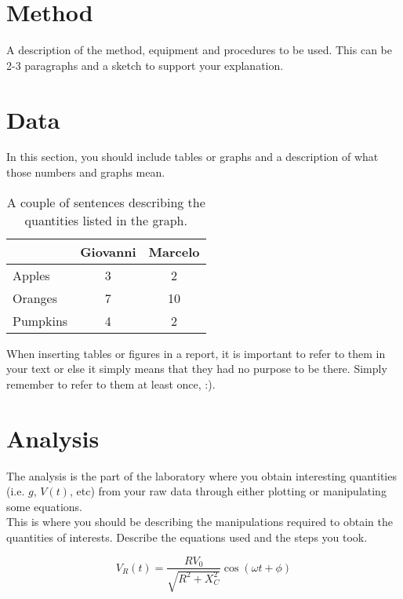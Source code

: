 \documentclass{article}[12pt]
\begin{document}
\section{Method}

A description of the method, equipment and procedures to be used. This can be 2-3 paragraphs and a sketch to support your explanation.

\section{Data}

In this section, you should include tables or graphs and a description of what those numbers and graphs mean.

\begin{table}[h]
\centering
\begin{tabular}{| l | c | c | }

\hline
		& Giovanni	& Marcelo\\
\hline \hline
Apples	&	3		&	2\\ 	\hline
Oranges	&	7		&	10\\ 	\hline
Pumpkins &	4		&	2\\	\hline

\end{tabular}
\caption{A couple of sentences describing the quantities listed in the graph.}
\label{Groceries}
\end{table}

When inserting tables or figures in a report, it is important to refer to them in your text or else it simply means that they had no purpose to be there. Simply remember to refer to them at least once, :).


\section{Analysis}

The analysis is the part of the laboratory where you obtain interesting quantities (i.e. $g$, $V(t)$, etc) from your raw data through either plotting or manipulating some equations.\\

This is where you should be describing the manipulations required to obtain the quantities of interests. Describe the equations used and the steps you took.

\begin{equation}
V_{R}(t) = \frac{RV_0}{\sqrt{R^2 + X_C^2}} \cos(\omega t + \phi)
\end{equation}
\end{document}
